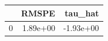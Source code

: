 \begin{tabular}{lrr}
\toprule
 & RMSPE & tau_hat \\
\midrule
0 & 1.89e+00 & -1.93e+00 \\
\bottomrule
\end{tabular}
